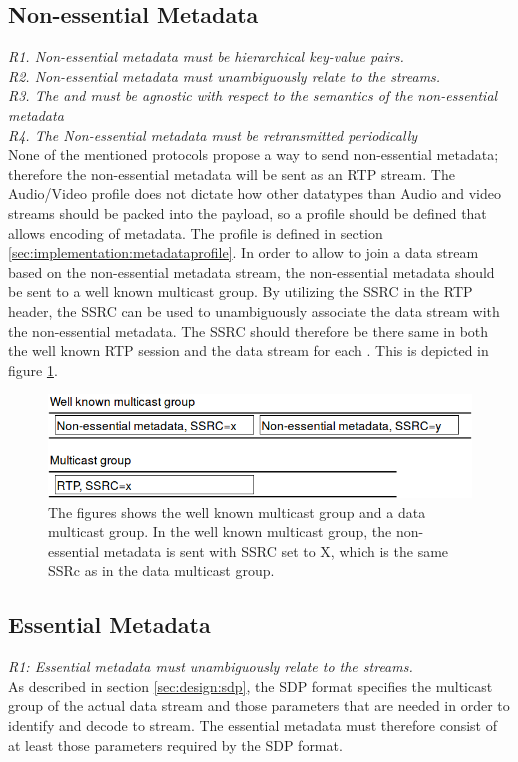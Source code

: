 \subsection{Non-essential Metadata} \label{sec:design:nonessential}
\textit{R1. Non-essential metadata must be hierarchical key-value pairs.} \\
\textit{R2. Non-essential metadata must unambiguously relate to the streams.} \\
\textit{R3. The \pub{} and \sub{} must be agnostic with respect to the semantics of the non-essential metadata} \\
\textit{R4. The Non-essential metadata must be retransmitted periodically}\\
None of the mentioned protocols propose a way to send non-essential metadata; therefore the non-essential metadata will be sent as an RTP stream. The Audio/Video profile does not dictate how other datatypes than Audio and video streams should be packed into the payload, so a profile should be defined that allows encoding of metadata. The profile is defined in section \ref{sec:implementation:metadataprofile}. In order to allow \subs{} to join a data stream based on the non-essential metadata stream, the non-essential metadata should be sent to a well known multicast group. By utilizing the SSRC in the RTP header, the SSRC can be used to unambiguously associate the data stream with the non-essential metadata. The SSRC should therefore be there same in both the well known RTP session and the data stream for each \pub{}. This is depicted in figure \ref{fig:design:nonessential:fig}.

\begin{figure}[H]
	\centering
	\includegraphics[width=\textwidth]{figures/non-essential-ssrc}
	\caption{The figures shows the well known multicast group and a data multicast group. In the well known multicast group, the non-essential metadata is sent with SSRC set to X, which is the same SSRc as in the data multicast group.} \label{fig:design:nonessential:fig}
\end{figure}


\subsection{Essential Metadata} \label{sec:design:essentalmetadata}
\textit{R1: Essential metadata must unambiguously relate to the streams.}\\
As described in section \ref{sec:design:sdp}, the SDP format specifies the multicast group of the actual data stream and those parameters that are needed in order to identify and decode to stream.
The essential metadata must therefore consist of at least those parameters required by the SDP format.\\

